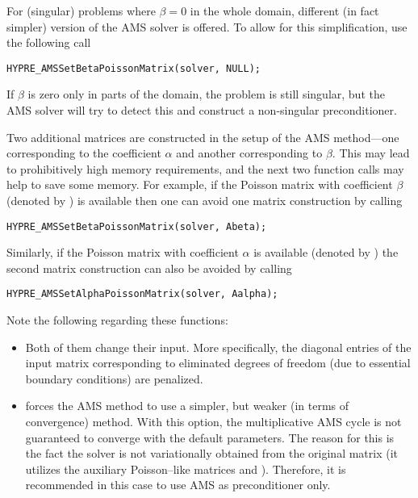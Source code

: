 For (singular) problems where $\beta = 0$ in the whole domain,
different (in fact simpler) version of the AMS solver is offered.
To allow for this simplification, use the following \hypre{} call
\begin{display}\begin{verbatim}
HYPRE_AMSSetBetaPoissonMatrix(solver, NULL);
\end{verbatim}\end{display}
If $\beta$ is zero only in parts of the domain, the problem is still
singular, but the AMS solver will try to detect this and construct
a non-singular preconditioner.

Two additional matrices are constructed in the setup of the
AMS method---one corresponding to the coefficient $\alpha$
and another corresponding to $\beta$.
This may  lead to prohibitively high memory requirements, and
the next two function calls may help to save some memory.
For example, if the Poisson matrix with coefficient $\beta$
(denoted by ) is
available then one can avoid one matrix construction by calling
\begin{display}\begin{verbatim}
HYPRE_AMSSetBetaPoissonMatrix(solver, Abeta);
\end{verbatim}\end{display}
Similarly, if the Poisson matrix with coefficient $\alpha$ is available
(denoted by )
the second matrix construction can also be avoided by calling
\begin{display}\begin{verbatim}
HYPRE_AMSSetAlphaPoissonMatrix(solver, Aalpha);
\end{verbatim}\end{display}
Note the following regarding these functions:
\begin{itemize}
\item Both of them change their input. More specifically,
the diagonal entries of the input matrix corresponding to eliminated
degrees of freedom (due to essential boundary conditions)
are penalized.
\item {} forces the
AMS method to use a simpler, but weaker (in terms of convergence) method.
With this option, the multiplicative AMS cycle
is not guaranteed to converge with the
default parameters. The reason for this is the fact the solver is not
variationally obtained from the original matrix (it utilizes
the auxiliary Poisson--like matrices  and ).
Therefore, it is recommended in this case to use AMS as preconditioner
only.
\end{itemize}

